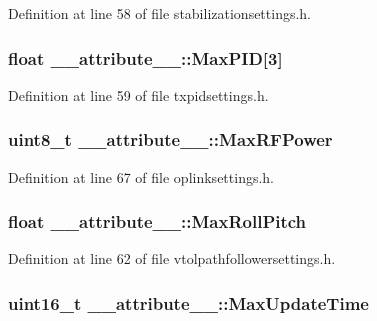 \-Definition at line 58 of file stabilizationsettings.\-h.

\hypertarget{struct____attribute_____a72ed8cba7b9bb727955581cdead3fe32}{
\subsubsection[{\-Max\-P\-I\-D}]{\setlength{\rightskip}{0pt plus 5cm}float {\bf \-\_\-\-\_\-attribute\-\_\-\-\_\-\-::\-Max\-P\-I\-D}\mbox{[}3\mbox{]}}}\label{struct____attribute_____a72ed8cba7b9bb727955581cdead3fe32}


\-Definition at line 59 of file txpidsettings.\-h.

\hypertarget{struct____attribute_____aca4f98bce6a41ab6258a04398f2ce0a5}{
\subsubsection[{\-Max\-R\-F\-Power}]{\setlength{\rightskip}{0pt plus 5cm}uint8\-\_\-t {\bf \-\_\-\-\_\-attribute\-\_\-\-\_\-\-::\-Max\-R\-F\-Power}}}\label{struct____attribute_____aca4f98bce6a41ab6258a04398f2ce0a5}


\-Definition at line 67 of file oplinksettings.\-h.

\hypertarget{struct____attribute_____a8a5b50d3ba4507a943e66a856903112b}{
\subsubsection[{\-Max\-Roll\-Pitch}]{\setlength{\rightskip}{0pt plus 5cm}float {\bf \-\_\-\-\_\-attribute\-\_\-\-\_\-\-::\-Max\-Roll\-Pitch}}}\label{struct____attribute_____a8a5b50d3ba4507a943e66a856903112b}


\-Definition at line 62 of file vtolpathfollowersettings.\-h.

\hypertarget{struct____attribute_____af148713957f57f356135e3bae826c4b2}{
\subsubsection[{\-Max\-Update\-Time}]{\setlength{\rightskip}{0pt plus 5cm}uint16\-\_\-t {\bf \-\_\-\-\_\-attribute\-\_\-\-\_\-\-::\-Max\-Update\-Time}}}\label{struct____attribute_____af148713957f57f356135e3bae826c4b2}


